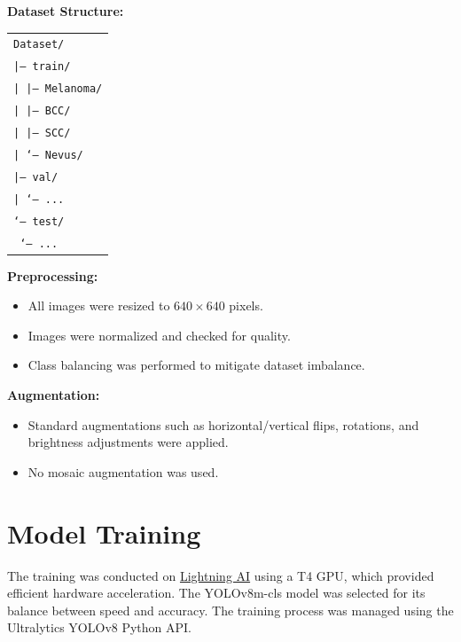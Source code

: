 \documentclass[a4paper,12pt]{report}
\begin{document}
\begin{spacing}{1.5}
    \textbf{Dataset Structure:}
    \begin{center}
    \begin{tabular}{l}
    \texttt{Dataset/} \\
    \hspace{0.5cm}\texttt{|-- train/} \\
    \hspace{1cm}\texttt{|   |-- Melanoma/} \\
    \hspace{1cm}\texttt{|   |-- BCC/} \\
    \hspace{1cm}\texttt{|   |-- SCC/} \\
    \hspace{1cm}\texttt{|   `-- Nevus/} \\
    \hspace{0.5cm}\texttt{|-- val/} \\
    \hspace{1cm}\texttt{|   `-- ...} \\
    \hspace{0.5cm}\texttt{`-- test/} \\
    \hspace{1cm}\texttt{    `-- ...} \\
    \end{tabular}
    \end{center}
    
    \textbf{Preprocessing:}
    \begin{itemize}
        \item All images were resized to $640 \times 640$ pixels.
        \item Images were normalized and checked for quality.
        \item Class balancing was performed to mitigate dataset imbalance.
    \end{itemize}
    
    \textbf{Augmentation:}
    \begin{itemize}
        \item Standard augmentations such as horizontal/vertical flips, rotations, and brightness adjustments were applied.
        \item No mosaic augmentation was used.
    \end{itemize}
    
    \section{Model Training}
    The training was conducted on \href{https://lightning.ai/}{Lightning AI} using a T4 GPU, which provided efficient hardware acceleration. The YOLOv8m-cls model was selected for its balance between speed and accuracy. The training process was managed using the Ultralytics YOLOv8 Python API.
    

\end{spacing}
\end{document}
